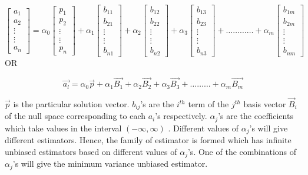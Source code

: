 \documentclass[12pt]{article}   	%
\begin{document}
\begin{equation}
\begin{bmatrix}
		a_1\\
		a_2\\
		\vdots\\
		\vdots\\
		a_n 
	\end{bmatrix} =\alpha_0
	\begin{bmatrix}
		p_1\\
		p_2\\
		\vdots\\
		\vdots\\
		p_n
	\end{bmatrix} 
	+\alpha_1
	\begin{bmatrix}
		b_{11}\\
		b_{21}\\
		\vdots\\
		\vdots\\
		b_{n1}
	\end{bmatrix} 
	+\alpha_2
	\begin{bmatrix}
		b_{12}\\
		b_{22}\\
		\vdots\\
		\vdots\\
		b_{n2}
	\end{bmatrix} 
	+\alpha_3
	\begin{bmatrix}
		b_{13}\\
		b_{23}\\
		\vdots\\
		\vdots\\
		b_{n3}
	\end{bmatrix} + \hdots \hdots \hdots \hdots+\alpha_m
	\begin{bmatrix}
		b_{1m}\\
		b_{2m}\\
		\vdots\\
		\vdots\\
		b_{nm}
	\end{bmatrix} 
\end{equation} \hspace{200pt} OR

\begin{equation}
\vec{a_l} = \alpha_0  \vec{p}+ \alpha_1  \vec{B_1 }+\alpha_2 \vec{B_2 }+\alpha_3 \vec{B_3 }+\hdots \hdots \hdots+\alpha_m \vec{B_m }  
\end{equation}

$\vec{p}$ is the particular solution vector. $b_{ij}$'s are the $i^{th}$ term of the $j^{th}$ basis vector $\vec{B}_i $ of the null space corresponding 
to each $a_i$'s respectively. $\alpha_j$'s are the coefficients which take values in the interval $(-\infty,\infty)$ . Different values of $\alpha_j$'s will give different estimators. Hence, the family of estimator is formed which has infinite unbiased estimators based on different values of $\alpha_j$'s. One of the combinations of $\alpha_j$'s will give the minimum variance unbiased estimator.
\end{document}
